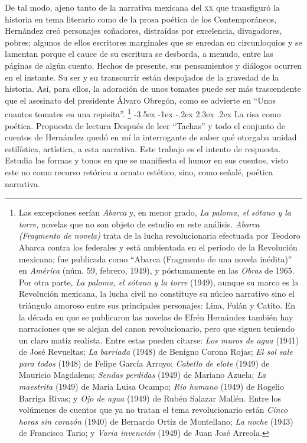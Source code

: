 \documentclass[14pt,twoside,final]{extbook} %
\makeatletter
\let\oldfootnote\footnote
\renewcommand\footnote[1]{%
\oldfootnote{\hspace{1mm}#1}}
\renewcommand\section{\@startsection {section}{1}{\z@}%
                                     {-3.5ex \@plus -1ex \@minus -.2ex}%
                                     {2.3ex \@plus .2ex}%
                                     {\normalfont\large\bfseries\sc}}
\makeatother
\begin{document}
De tal modo, ajeno tanto de la narrativa mexicana del \textsc{xx} que transfiguró la historia en tema literario como de la prosa poética de los Contemporáneos, Hernández creó personajes soñadores, distraídos por excelencia, divagadores, pobres; algunos de ellos escritores marginales que se enredan en circunloquios y se lamentan porque el cauce de su escritura se desborda, a menudo, entre las páginas de algún cuento. Hechos de presente, sus pensamientos y diálogos ocurren en el instante. Su ser y su transcurrir están despojados de la gravedad de la historia. Así, para ellos, la adoración de unos tomates puede ser más trascendente que el asesinato del presidente Álvaro Obregón, como se advierte en ``Unos cuantos tomates en una repisita''.\footnote{Las excepciones serían \emph{Abarca} y, en menor grado, \emph{La paloma, el sótano y la torre,} novelas que no son objeto de estudio en este análisis. \emph{Abarca (Fragmento de novela)} trata de la lucha revolucionaria efectuada por Teodoro Abarca contra los federales y está ambientada en el periodo de la Revolución mexicana; fue publicada como ``Abarca (Fragmento de una novela inédita)'' en \emph{América} (núm. 59, febrero, 1949), y póstumamente en las \emph{Obras} de 1965. Por otra parte, \emph{La paloma, el sótano y la torre} (1949), aunque su marco es la Revolución mexicana, la lucha civil no constituye su núcleo narrativo sino el triángulo amoroso entre sus principales personajes: Lina, Fulán y Catito. En la década en que se publicaron las novelas de Efrén Hernández también hay narraciones que se alejan del canon revolucionario, pero que siguen teniendo un claro matiz realista. Entre estas pueden citarse: \emph{Los muros de agua} (1941) de José Revueltas; \emph{La barriada} (1948) de Benigno Corona Rojas; \emph{El sol sale para todos} (1948) de Felipe García Arroyo; \emph{Cabello de elote} (1949) de Mauricio Magdaleno; \emph{Sendas perdidas} (1949) de Mariano Azuela; \emph{La maestrita} (1949) de María Luisa Ocampo; \emph{Río humano} (1949) de Rogelio Barriga Rivas; y \emph{Ojo de agua} (1949) de Rubén Salazar Mallén. Entre los volúmenes de cuentos que ya no tratan el tema revolucionario están \emph{Cinco horas sin corazón} (1940) de Bernardo Ortiz de Montellano; \emph{La noche} (1943) de Francisco Tario; y \emph{Varia invención} (1949) de Juan José Arreola.}
\section{La risa como poética. Propuesta de lectura}\label{sec:la-risa-como-poetica-propuesta-de-lectura}\protect\enlargethispage*{\baselineskip}
Después de leer ``Tachas'' y todo el conjunto de cuentos de Hernández quedó en mí la interrogante de saber qué otorgaba unidad estilística, artística, a esta narrativa. Este trabajo es el intento de respuesta. Estudia las formas y tonos en que se manifiesta el humor en sus cuentos, visto este no como recurso retórico u ornato estético, sino, como señalé, poética narrativa.
\end{document}
